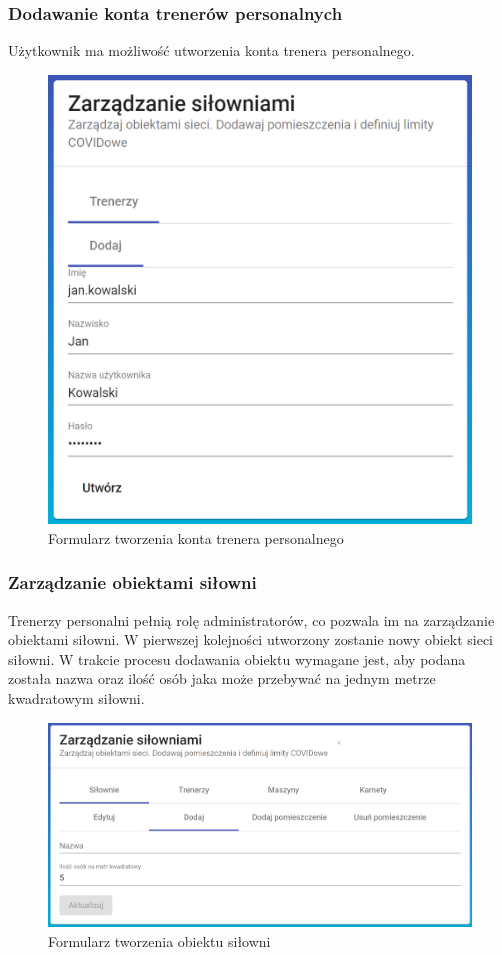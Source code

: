 \documentclass[a4paper,twoside,12pt]{book}
\begin{document}
\subsubsection{Dodawanie konta trenerów personalnych}
Użytkownik ma możliwość utworzenia konta trenera personalnego.
\begin{figure}[h!]
	\centering
	\includegraphics[width=0.5\linewidth]{../zrzuty_ekranu/dzialanie/trener_personalny/tworzenie_konta_trenera_personalnego}
	\caption{Formularz tworzenia konta trenera personalnego}
	\label{fig:tworzeniekontatrenerapersonalnego}
\end{figure}
\FloatBarrier

\subsubsection{Zarządzanie obiektami siłowni}
Trenerzy personalni pełnią rolę administratorów, co pozwala im na zarządzanie obiektami siłowni.
W pierwszej kolejności utworzony zostanie nowy obiekt sieci siłowni. W trakcie procesu dodawania obiektu wymagane jest, aby podana została nazwa oraz ilość osób jaka może przebywać na jednym metrze kwadratowym siłowni.
\begin{figure}[h!]
	\centering
	\includegraphics[width=0.75\linewidth]{../zrzuty_ekranu/dzialanie/obiekty/tworzenie}
	\caption{Formularz tworzenia obiektu siłowni}
	\label{fig:tworzenie}
\end{figure}
\FloatBarrier
\end{document}
